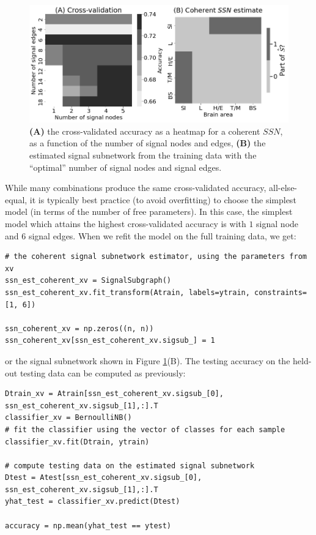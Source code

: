\begin{figure}
    \centering
    \includegraphics[width=0.8\linewidth]{applications/ch9/Images/ssn_inco_acc.png}
    \caption[Cross-validated accuracy heatmap for coherent $SSN$]{\textbf{(A)} the cross-validated accuracy as a heatmap for a coherent $SSN$, as a function of the number of signal nodes and edges, \textbf{(B)} the estimated signal subnetwork from the training data with the ``optimal'' number of signal nodes and signal edges.}
    \label{fig:ch9:ssn:ssn_inco_acc}
\end{figure}
While many combinations produce the same cross-validated accuracy, all-else-equal, it is typically best practice (to avoid overfitting) to choose the simplest model (in terms of the number of free parameters). In this case, the simplest model which attains the highest cross-validated accuracy is with $1$ signal node and $6$ signal edges. When we refit the model on the full training data, we get:

\begin{lstlisting}[style=python]
# the coherent signal subnetwork estimator, using the parameters from xv
ssn_est_coherent_xv = SignalSubgraph()
ssn_est_coherent_xv.fit_transform(Atrain, labels=ytrain, constraints=[1, 6])

ssn_coherent_xv = np.zeros((n, n))
ssn_coherent_xv[ssn_est_coherent_xv.sigsub_] = 1
\end{lstlisting}

or the signal subnetwork shown in Figure \ref{fig:ch9:ssn:ssn_inco_acc}(B). The testing accuracy on the held-out testing data can be computed as previously:

\begin{lstlisting}[style=python]
Dtrain_xv = Atrain[ssn_est_coherent_xv.sigsub_[0], ssn_est_coherent_xv.sigsub_[1],:].T
classifier_xv = BernoulliNB()
# fit the classifier using the vector of classes for each sample
classifier_xv.fit(Dtrain, ytrain)

# compute testing data on the estimated signal subnetwork
Dtest = Atest[ssn_est_coherent_xv.sigsub_[0], ssn_est_coherent_xv.sigsub_[1],:].T
yhat_test = classifier_xv.predict(Dtest)

accuracy = np.mean(yhat_test == ytest)
\end{lstlisting}